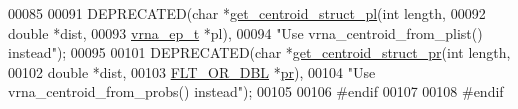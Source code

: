 \begin{DoxyCode}
00085 
00091 DEPRECATED(\textcolor{keywordtype}{char} *\hyperlink{centroid_8h_a7dcc64bcefcf682396dd3bbea02416fe}{get\_centroid\_struct\_pl}(\textcolor{keywordtype}{int}       length,
00092                                         \textcolor{keywordtype}{double}    *dist,
00093                                         \hyperlink{group__struct__utils__plist_structvrna__elem__prob__s}{vrna\_ep\_t} *pl),
00094            \textcolor{stringliteral}{"Use vrna\_centroid\_from\_plist() instead"});
00095 
00101 DEPRECATED(\textcolor{keywordtype}{char} *\hyperlink{centroid_8h_ac92486ce514677256f4a832dc518759c}{get\_centroid\_struct\_pr}(\textcolor{keywordtype}{int}         length,
00102                                         \textcolor{keywordtype}{double}      *dist,
00103                                         \hyperlink{group__data__structures_ga31125aeace516926bf7f251f759b6126}{FLT\_OR\_DBL}  *\hyperlink{fold__vars_8h_ac98ec419070aee6831b44e5c700f090f}{pr}),
00104            \textcolor{stringliteral}{"Use vrna\_centroid\_from\_probs() instead"});
00105 
00106 \textcolor{preprocessor}{#endif}
00107 
00108 \textcolor{preprocessor}{#endif}
\end{DoxyCode}
